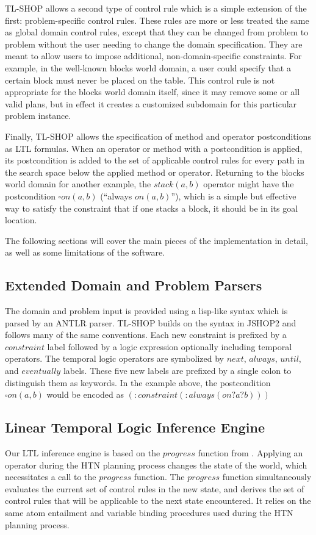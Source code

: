 \documentclass[12pt]{article}
\begin{document}
TL-SHOP allows a second type of control rule which is a simple extension of the 
first: problem-specific control rules. These rules are more or less treated the 
same as global domain control rules, except that they can be changed from 
problem to problem without the user needing to change the domain specification. 
They are meant to allow users to impose additional, non-domain-specific 
constraints. For example, in the well-known blocks world domain, a user could 
specify that a certain block must never be placed on the table. This control 
rule is not appropriate for the blocks world domain itself, since it may remove 
some or all valid plans, but in effect it creates a customized subdomain for 
this particular problem instance.

Finally, TL-SHOP allows the specification of method and operator postconditions 
as LTL formulas. When an operator or method with a postcondition is applied, 
its postcondition is added to the set of applicable control rules for every 
path in the search space below the applied method or operator. Returning to the 
blocks world domain for another example, the $stack(a, b)$ operator might have 
the postcondition $\square on(a, b)$ (``always $on(a, b)$''), which is a simple 
but effective way to satisfy the constraint that if one stacks a block, it 
should be in its goal location.

The following sections will cover the main pieces of the implementation in 
detail, as well as some limitations of the software.

\subsection{Extended Domain and Problem Parsers}
The domain and problem input is provided using a lisp-like syntax which is
parsed by an ANTLR parser. TL-SHOP builds on the syntax in JSHOP2 and follows
many of the same conventions. Each new constraint is prefixed by a $constraint$
label followed by a logic expression optionally including temporal operators. The temporal
logic operators are symbolized by $next$, $always$, $until$, and $eventually$
labels. These five new labels are prefixed by a single colon to distinguish them
as keywords. In the example above, the postcondition $\square on(a, b)$ would be
encoded as $(:constraint (:always (on ?a ?b)))$

\subsection{Linear Temporal Logic Inference Engine}
Our LTL inference engine is based on the $progress$ function from 
\cite{nau2004apt}. Applying an operator during the HTN planning process changes 
the state of the world, which necessitates a call to the $progress$ function. 
The $progress$ function simultaneously evaluates the current set of control 
rules in the new state, and derives the set of control rules that will be 
applicable to the next state encountered. It relies on the same atom entailment 
and variable binding procedures used during the HTN planning process.
\end{document}
